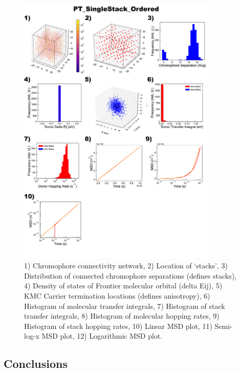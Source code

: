 \documentclass[12pt]{article}
\begin{document}
\begin{figure}[h]\centering
	\includegraphics[width=0.85\textwidth]{Figures/PT_SingleStack_Ordered.png}
    \caption{   1) Chromophore connectivity network, 
                2) Location of `stacks', 
                3) Distribution of connected chromophore separations (defines stacks),
                4) Density of states of Frontier molecular orbital (delta Eij),
                5) KMC Carrier termination locations (defines anisotropy),
                6) Histogram of molecular transfer integrals,
                7) Histogram of stack transfer integrals,
                8) Histogram of molecular hopping rates,
                9) Histogram of stack hopping rates,
                10) Linear MSD plot,
                11) Semi-log-x MSD plot,
                12) Logarithmic MSD plot.}
	\label{fig:PTSingOrd}
\end{figure}


\subsection{Conclusions}
\end{document}
